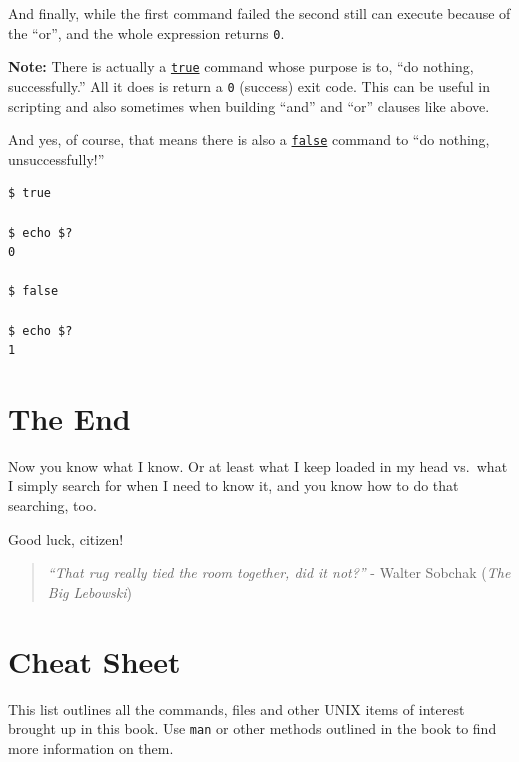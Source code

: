 \documentclass[10pt,]{book}
\renewcommand{\chaptername}{Step}
\numberwithin{figure}{chapter}
\begin{document}
And finally, while the first command failed the second still can execute
because of the ``or'', and the whole expression returns \texttt{0}.

\textbf{Note:} There is actually a
\href{http://linux.die.net/man/1/true}{\texttt{true}} command whose
purpose is to, ``do nothing, successfully.'' All it does is return a
\texttt{0} (success) exit code. This can be useful in scripting and also
sometimes when building ``and'' and ``or'' clauses like above.

And yes, of course, that means there is also a
\href{http://linux.die.net/man/1/false}{\texttt{false}} command to ``do
nothing, unsuccessfully!''

\begin{verbatim}
$ true

$ echo $?
0

$ false

$ echo $?
1
\end{verbatim}

\section{The End}\label{the-end}

Now you know what I know. Or at least what I keep loaded in my head
vs.~what I simply search for when I need to know it, and you know how to
do that searching, too.

Good luck, citizen!

\renewcommand{\chaptername}{}
\renewcommand{\thechapter}{}


\begin{quote}
\emph{``That rug really tied the room together, did it not?''} - Walter
Sobchak (\emph{The Big Lebowski})
\end{quote}

\section{Cheat Sheet}\label{cheat-sheet}

This list outlines all the commands, files and other UNIX items of
interest brought up in this book. Use \texttt{man} or other methods
outlined in the book to find more information on them.
\end{document}
